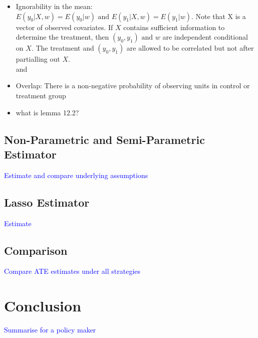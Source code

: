 \documentclass{article}
\begin{document}
\begin{itemize}
    \item Ignorability in the mean: $E(y_0|X, w) = E(y_0|w) \text{  and  } E(y_1|X, w) = E(y_1|w)$. Note that X is a vector of observed covariates. If $X$ contains sufficient information to determine the treatment, then $(y_0, y_1) \text{  and  } w$ are independent conditional on $X$. The treatment and $(y_0, y_1)$ are allowed to be correlated but not after partialling out $X$.\\ and
    \item Overlap: There is a non-negative probability of observing units in control or treatment group
    \item what is lemma 12.2?
\end{itemize}

\subsection{Non-Parametric and Semi-Parametric Estimator}

\textcolor{blue}{Estimate and compare underlying assumptions}

\subsection{Lasso Estimator}

\textcolor{blue}{Estimate}

\subsection{Comparison}

\textcolor{blue}{Compare ATE estimates under all strategies}


\newpage
\section{Conclusion}

\textcolor{blue}{Summarise for a policy maker}
\end{document}
